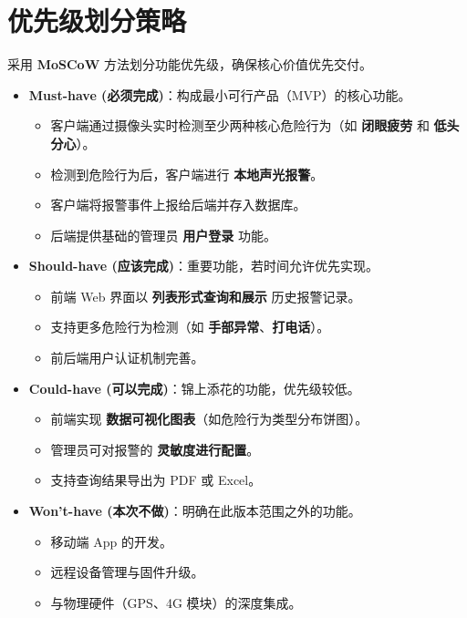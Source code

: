 \documentclass[a4paper,12pt]{article}
\begin{document}
\section{优先级划分策略}
采用 \textbf{MoSCoW} 方法划分功能优先级，确保核心价值优先交付。
\begin{itemize}
  \item \textbf{Must-have (必须完成)}：构成最小可行产品（MVP）的核心功能。
    \begin{itemize}
      \item 客户端通过摄像头实时检测至少两种核心危险行为（如 \textbf{闭眼疲劳} 和 \textbf{低头分心}）。
      \item 检测到危险行为后，客户端进行 \textbf{本地声光报警}。
      \item 客户端将报警事件上报给后端并存入数据库。
      \item 后端提供基础的管理员 \textbf{用户登录} 功能。
    \end{itemize}
  \item \textbf{Should-have (应该完成)}：重要功能，若时间允许优先实现。
    \begin{itemize}
      \item 前端 Web 界面以 \textbf{列表形式查询和展示} 历史报警记录。
      \item 支持更多危险行为检测（如 \textbf{手部异常}、\textbf{打电话}）。
      \item 前后端用户认证机制完善。
    \end{itemize}
  \item \textbf{Could-have (可以完成)}：锦上添花的功能，优先级较低。
    \begin{itemize}
      \item 前端实现 \textbf{数据可视化图表}（如危险行为类型分布饼图）。
      \item 管理员可对报警的 \textbf{灵敏度进行配置}。
      \item 支持查询结果导出为 PDF 或 Excel。
    \end{itemize}
  \item \textbf{Won't-have (本次不做)}：明确在此版本范围之外的功能。
    \begin{itemize}
      \item 移动端 App 的开发。
      \item 远程设备管理与固件升级。
      \item 与物理硬件（GPS、4G 模块）的深度集成。
    \end{itemize}
\end{itemize}
\end{document}

